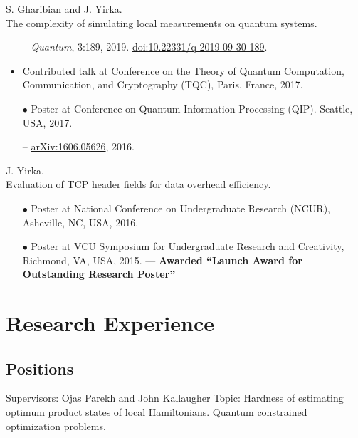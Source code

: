 \documentclass[11pt,letterpaper,serif]{moderncv}
\newcommand{\pubItemSep}{0em}
\begin{document}
S. Gharibian and J. Yirka.
\\The complexity of simulating local measurements on quantum systems.
\begin{adjustwidth}{.1in}{}
	\begin{itemize}[itemsep=\pubItemSep]
		\item[--] \textit{Quantum}, 3:189, 2019. \quad
		\href{https://doi.org/10.22331/q-2019-09-30-189}{doi:10.22331/q-2019-09-30-189}.
		\item Contributed talk at Conference on the Theory of Quantum Computation, Communication,
		and Cryptography (TQC), Paris, France, 2017.
		\item[$\bullet$] Poster at Conference on Quantum Information Processing (QIP). Seattle, USA, 2017.
		\item[--] \href{https://arxiv.org/abs/1606.05626}{arXiv:1606.05626}, 2016.
	\end{itemize}
\end{adjustwidth}
\vspace{\parsep}

J. Yirka.
\\Evaluation of TCP header fields for data overhead efficiency.
\begin{adjustwidth}{.1in}{}
	\begin{itemize}[itemsep=\pubItemSep]
		\item[$\bullet$] Poster at National Conference on Undergraduate Research (NCUR), Asheville, NC, USA, 2016.
		\item[$\bullet$] Poster at VCU Symposium for Undergraduate Research and Creativity, Richmond, VA, USA, 2015. --- \textbf{Awarded ``Launch Award for Outstanding Research Poster''}
	\end{itemize}
\end{adjustwidth}


\section{Research Experience}
\subsection{Positions}
{
	\begin{adjustwidth}{.25in}{}
		Supervisors: Ojas Parekh and John Kallaugher \newline
		Topic: Hardness of estimating optimum product states of local Hamiltonians. Quantum constrained optimization problems.
	\end{adjustwidth}
}
\end{document}

